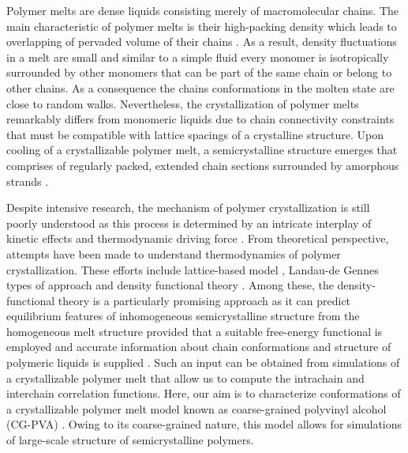 \documentclass[pre,showpacs,notitlepage,twocolumn]{revtex4-1}
\begin{document}
Polymer melts  are dense liquids  consisting merely of macromolecular chains. The main characteristic of polymer melts is their high-packing density
which leads to  overlapping of pervaded volume of their chains \cite{Rubinstein}. As a result, density fluctuations in a melt are small and  similar to a simple fluid every monomer is isotropically surrounded by other monomers that can be part
of the same chain or belong to other chains. As a consequence the chains conformations in the molten state are close to random walks.
Nevertheless, the crystallization of polymer melts   remarkably differs from monomeric liquids due  to chain connectivity constraints that must be compatible with lattice spacings of
a crystalline structure. 
Upon  cooling of a crystallizable polymer melt, a semicrystalline structure emerges that comprises  of  regularly packed, extended chain 
sections surrounded by amorphous strands \cite{semicrys}. 


 
Despite intensive research, the mechanism of polymer crystallization is still poorly understood as 
this process is determined by an intricate interplay of  kinetic effects  and thermodynamic driving force 
\cite{Keller,Sommercrys}. From theoretical perspective, attempts have been made to understand thermodynamics of polymer crystallization. 
These efforts include lattice-based model \cite{Florycrys}, Landau-de Gennes  types of approach \cite{Olmsted} and 
density functional theory \cite{DFTPaul,DFT1}. Among these, the density-functional theory 
is a particularly promising approach as it  can predict equilibrium features of  inhomogeneous   semicrystalline structure from the 
homogeneous melt  structure  provided  that a suitable free-energy functional is employed and accurate information about chain conformations and structure of polymeric liquids
is supplied \cite{DFTreview}.  Such an input can be obtained from simulations of a crystallizable polymer melt that allow us to compute the intrachain and interchain  correlation functions. Here, our aim is to characterize conformations of a crystallizable polymer melt model known as  coarse-grained polyvinyl alcohol (CG-PVA) \cite{Meyer2001}. Owing to its coarse-grained nature, this model allows for simulations of large-scale structure of semicrystalline polymers.
  
\end{document}
